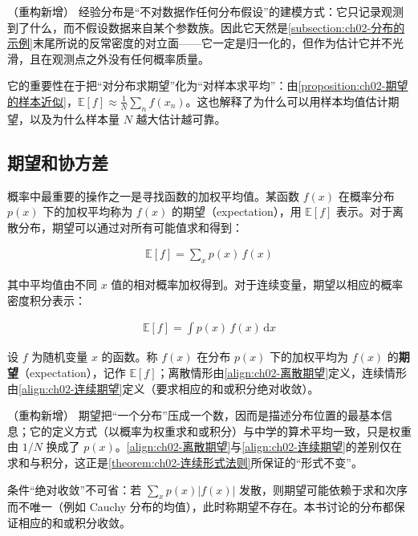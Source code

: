 \documentclass[../../main.tex]{subfiles}
\begin{document}
\begin{remark}（重构新增）
经验分布是“不对数据作任何分布假设”的建模方式：它只记录观测到了什么，而不假设数据来自某个参数族。因此它天然是\cref{subsection:ch02-分布的示例}末尾所说的反常密度的对立面——它一定是归一化的，但作为估计它并不光滑，且在观测点之外没有任何概率质量。

它的重要性在于把“对分布求期望”化为“对样本求平均”：由\cref{proposition:ch02-期望的样本近似}，$\mathbb{E}[f]\approx\frac{1}{N}\sum_n f(x_n)$。这也解释了为什么可以用样本均值估计期望，以及为什么样本量 $N$ 越大估计越可靠。
\end{remark}

\subsection{期望和协方差}\label{subsection:ch02-期望和协方差}

概率中最重要的操作之一是寻找函数的加权平均值。某函数 $f(x)$ 在概率分布 $p(x)$ 下的加权平均称为 $f(x)$ 的期望（expectation），用 $\mathbb{E}[f]$ 表示。对于离散分布，期望可以通过对所有可能值求和得到：

\begin{align}
  \mathbb{E}[f] = \sum_{x} p(x)\,f(x)
  \label{align:ch02-离散期望}
\end{align}

其中平均值由不同 $x$ 值的相对概率加权得到。对于连续变量，期望以相应的概率密度积分表示：

\begin{align}
  \mathbb{E}[f] = \int p(x)\,f(x)\,\mathrm{d}x
  \label{align:ch02-连续期望}
\end{align}

\begin{definition}[期望]\label{definition:ch02-期望}
设 $f$ 为随机变量 $x$ 的函数。称 $f(x)$ 在分布 $p(x)$ 下的加权平均为 $f(x)$ 的\textbf{期望}（expectation），记作 $\mathbb{E}[f]$；离散情形由\eqref{align:ch02-离散期望}定义，连续情形由\eqref{align:ch02-连续期望}定义（要求相应的和或积分绝对收敛）。
\end{definition}

\begin{remark}（重构新增）
期望把“一个分布”压成一个数，因而是描述分布位置的最基本信息；它的定义方式（以概率为权重求和或积分）与中学的算术平均一致，只是权重由 $1/N$ 换成了 $p(x)$。\eqref{align:ch02-离散期望}与\eqref{align:ch02-连续期望}的差别仅在求和与积分，这正是\cref{theorem:ch02-连续形式法则}所保证的“形式不变”。

条件“绝对收敛”不可省：若 $\sum_x p(x)|f(x)|$ 发散，则期望可能依赖于求和次序而不唯一（例如 Cauchy 分布的均值），此时称期望不存在。本书讨论的分布都保证相应的和或积分收敛。
\end{remark}
\end{document}
